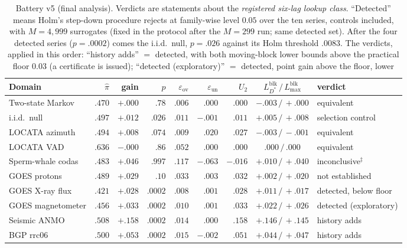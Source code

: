 \documentclass[acmsmall,screen,review,anonymous]{acmart}
\begin{document}
\begin{table}[h]\centering\footnotesize
\begin{tabular}{lrrrrrrcl}
\toprule
Domain & $\hat\pi$ & gain & $p$ & $\varepsilon_{\mathrm{ov}}$ &
$\varepsilon_{\mathrm{un}}$ & $U_2$ & $L^{\mathrm{blk}}_{D^*}\,/\,L^{\mathrm{blk}}_{\max}$ & verdict \\
\midrule
Two-state Markov & $.470$ & $+.000$ & $.78$ & $.006$ & $.000$ & $.000$ & $-.003\,/\,+.000$ & equivalent \\
i.i.d.\ null & $.497$ & $+.012$ & $.026$ & $.011$ & $-.001$ & $.011$ & $+.005\,/\,+.008$ & selection control \\
LOCATA azimuth & $.494$ & $+.008$ & $.074$ & $.009$ & $.020$ & $.027$ & $-.003\,/\,-.001$ & equivalent \\
LOCATA VAD & $.636$ & $-.000$ & $.86$ & $.052$ & $.000$ & $.000$ & $.000\,/\,.000$ & equivalent \\
Sperm-whale codas & $.483$ & $+.046$ & $.997$ & $.117$ & $-.063$ & $-.016$ & $+.010\,/\,+.040$ & inconclusive$^{\ddagger}$ \\
GOES protons & $.489$ & $+.029$ & $.10$ & $.033$ & $.003$ & $.032$ & $+.002\,/\,+.020$ & not established \\
GOES X-ray flux & $.421$ & $+.028$ & $.0002$ & $.008$ & $.001$ & $.028$ & $+.011\,/\,+.017$ & detected, below floor \\
GOES magnetometer & $.456$ & $+.033$ & $.0002$ & $.010$ & $.001$ & $.033$ & $+.022\,/\,+.026$ & detected (exploratory) \\
Seismic ANMO & $.508$ & $+.158$ & $.0002$ & $.014$ & $.000$ & $.158$ & $\mathbf{+.146\,/\,+.145}$ & history adds \\
BGP rrc06 & $.500$ & $+.053$ & $.0002$ & $.015$ & $-.002$ & $.051$ & $+.044\,/\,+.047$ & history adds \\
\bottomrule
\end{tabular}
\caption{Battery v5 (final analysis). Verdicts are statements about the
\emph{registered six-lag lookup class}. ``Detected'' means Holm's
step-down procedure rejects at family-wise level $0.05$ over the ten
series, controls included, with $M=4{,}999$ surrogates (fixed in the
protocol after the $M=299$ run; same detected set). After the four detected series ($p=.0002$) comes the
i.i.d.\ null, $p=.026$ against its Holm threshold $.0083$. The verdicts, applied
in this order: ``history adds'' $=$ detected, with both moving-block lower
bounds above the practical floor $0.03$ (a certificate is issued);
``detected (exploratory)'' $=$ detected, point gain above the floor, lower
}
\end{table}
\end{document}
